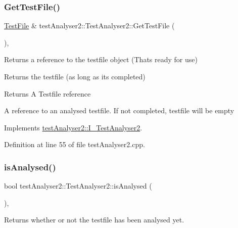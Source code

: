 \subsubsection{\texorpdfstring{GetTestFile()}{GetTestFile()}}
{\footnotesize\ttfamily \mbox{\hyperlink{classtestAnalyser2_1_1TestFile}{Test\+File}} \& test\+Analyser2\+::\+Test\+Analyser2\+::\+Get\+Test\+File (\begin{DoxyParamCaption}{ }\end{DoxyParamCaption})\hspace{0.3cm}{\ttfamily [override]}, {\ttfamily [virtual]}}



Returns a reference to the testfile object (That\textquotesingle{}s ready for use) 

Returns the testfile (as long as it\textquotesingle{}s completed)

\begin{DoxyReturn}{Returns}
A Testfile reference

A reference to an analysed testfile. If not completed, testfile will be empty 
\end{DoxyReturn}


Implements \mbox{\hyperlink{classtestAnalyser2_1_1I__TestAnalyser2_a82d50511e174a98572f8706d8ef06cc6}{test\+Analyser2\+::\+I\+\_\+\+Test\+Analyser2}}.



Definition at line 55 of file test\+Analyser2.\+cpp.

\mbox{\label{classtestAnalyser2_1_1TestAnalyser2_adc5a43d9fea5357959b1509af82a8580}} 
\subsubsection{\texorpdfstring{isAnalysed()}{isAnalysed()}}
{\footnotesize\ttfamily bool test\+Analyser2\+::\+Test\+Analyser2\+::is\+Analysed (\begin{DoxyParamCaption}{ }\end{DoxyParamCaption})\hspace{0.3cm}{\ttfamily [override]}, {\ttfamily [virtual]}}



Returns whether or not the testfile has been analysed yet. 

